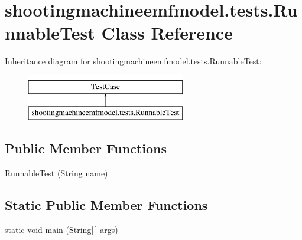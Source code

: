 \hypertarget{classshootingmachineemfmodel_1_1tests_1_1_runnable_test}{\section{shootingmachineemfmodel.\-tests.\-Runnable\-Test Class Reference}
\label{classshootingmachineemfmodel_1_1tests_1_1_runnable_test}
}
Inheritance diagram for shootingmachineemfmodel.\-tests.\-Runnable\-Test\-:\begin{figure}[H]
\begin{center}
\leavevmode
\includegraphics[height=2.000000cm]{classshootingmachineemfmodel_1_1tests_1_1_runnable_test}
\end{center}
\end{figure}
\subsection*{Public Member Functions}
\begin{DoxyCompactItemize}
\item 
\hyperlink{classshootingmachineemfmodel_1_1tests_1_1_runnable_test_ac292ab9069932c080ebb2d7fabf0f5c0}{Runnable\-Test} (String name)
\end{DoxyCompactItemize}
\subsection*{Static Public Member Functions}
\begin{DoxyCompactItemize}
\item 
static void \hyperlink{classshootingmachineemfmodel_1_1tests_1_1_runnable_test_a4904a4acf4634853eb64594971d4984f}{main} (String\mbox{[}$\,$\mbox{]} args)
\end{DoxyCompactItemize}
